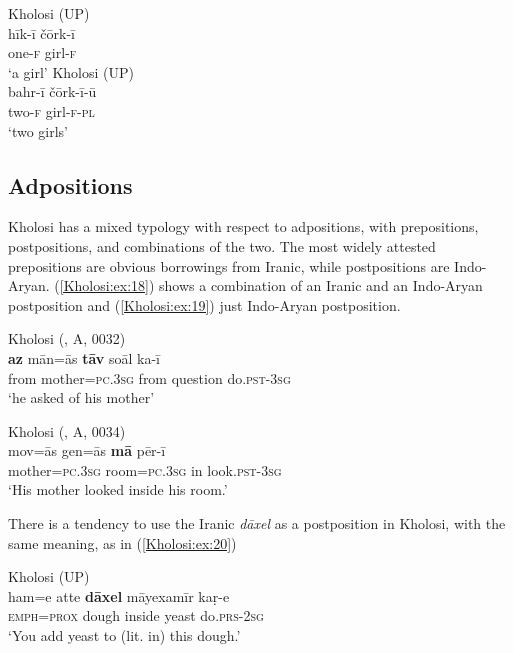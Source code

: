 \documentclass[output=paper,colorlinks,citecolor=brown]{langscibook}
\begin{document}
\ea\label{Kholosi:ex:17}
\ea\label{Kholosi:ex:17a}
Kholosi (UP)\\
\gll hīk-ī čōrk-ī \\
one\textsc{-f} girl\textsc{-f} \\
\glt `a girl'
\ex\label{Kholosi:ex:17b}
Kholosi (UP)\\
\gll bahr-ī čōrk-ī-ū \\
two\textsc{-f} girl\textsc{-f-pl} \\
\glt `two girls'
\z
\z

\subsection{Adpositions}\label{Kholosi:ss:3.5}

Kholosi has a mixed typology with respect to adpositions, with prepositions, postpositions, and combinations of the two. The most widely attested prepositions are obvious borrowings from Iranic, while postpositions are Indo-Aryan. (\ref{Kholosi:ex:18}) shows a combination of an Iranic  and an Indo-Aryan postposition and (\ref{Kholosi:ex:19}) just Indo-Aryan postposition.

\ea\label{Kholosi:ex:18}
Kholosi (\citealt{nourzaei_kholosi_2022}, A, 0032)\\
\gll \textbf{az} mān=ās \textbf{tāv} soāl ka-ī \\
from mother\textsc{=pc.3sg} from question do\textsc{.pst-3sg} \\
\glt `he asked of his mother'
\z

\ea\label{Kholosi:ex:19}
Kholosi (\citealt{nourzaei_kholosi_2022}, A, 0034)\\
\gll mov=ās gen=ās \textbf{mā} pēr-ī \\
mother\textsc{=pc.3sg} room\textsc{=pc.3sg} in look\textsc{.pst-3sg} \\
\glt`His mother looked inside his room.'
\z

There is a tendency to use the Iranic  \textit{dāxel} as a postposition in Kholosi, with the same meaning, as in (\ref{Kholosi:ex:20})

\ea\label{Kholosi:ex:20}
Kholosi (UP)\\
\gll ham=e atte \textbf{dāxel} māyexamīr kaṛ-e \\
\textsc{emph=prox} dough inside yeast do\textsc{.prs-2sg} \\
\glt `You add yeast to (lit. in) this dough.'
\z
\end{document}
